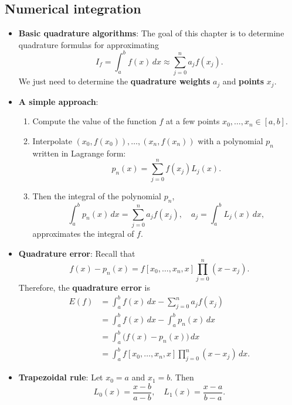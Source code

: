 \documentclass{report}
\begin{document}
     \subsection{Numerical integration}
     \begin{itemize}
         \item \textbf{Basic quadrature algorithms}:
             The goal of this chapter is to determine quadrature formulas for approximating
             $$
             I_f = \int_a^b f(x)\,dx \approx \sum_{j=0}^n a_j f(x_j).
             $$
             We just need to determine the \textbf{quadrature weights} $a_j$ and \textbf{points} $x_j$.
        \item \textbf{A simple approach}:
            \begin{enumerate}
                \item Compute the value of the function $f$ at a few points $x_0,\ldots,x_n \in [a,b]$.
                \item Interpolate $(x_0,f(x_0)),\ldots,(x_n,f(x_n))$ with a polynomial $p_n$ written in Lagrange form:
                    $$
                    p_n(x) = \sum_{j=0}^n f(x_j) L_j(x).
                    $$
                \item Then the integral of the polynomial $p_n$,
                    $$
                    \int_a^b p_n(x)\,dx = \sum_{j=0}^n a_j f(x_j), \quad a_j = \int_a^b L_j(x)\,dx,
                    $$
                    approximates the integral of $f$.
            \end{enumerate}
        \item \textbf{Quadrature error}:
            Recall that
            $$
            f(x) - p_n(x) = f[x_0,\ldots,x_n,x] \prod_{j=0}^n (x - x_j).
            $$
            Therefore, the \textbf{quadrature error} is
            \begin{align*}
                E(f) 
                &= \int_a^b f(x)\,dx - \sum_{j=0}^n a_j f(x_j) \\
                &= \int_a^b f(x)\,dx - \int_a^b p_n(x)\,dx \\
                &= \int_a^b \bigl(f(x) - p_n(x)\bigr)\,dx \\
                &= \int_a^b f[x_0,\ldots,x_n,x] \prod_{j=0}^n (x - x_j)\,dx.
            \end{align*}
        \item \textbf{Trapezoidal rule}:
            Let $x_0 = a$ and $x_1 = b$. Then
            $$
            L_0(x) = \frac{x - b}{a - b}, \quad L_1(x) = \frac{x - a}{b - a}.
$$
\end{itemize}
\end{document}
